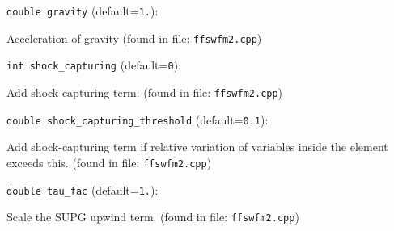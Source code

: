 \item\verb+double gravity+ {\rm(default=\verb|1.|)}:

Acceleration of gravity
 (found in file: \verb+ffswfm2.cpp+)
\item\verb+int shock_capturing+ {\rm(default=\verb|0|)}:

Add shock-capturing term.
 (found in file: \verb+ffswfm2.cpp+)
\item\verb+double shock_capturing_threshold+ {\rm(default=\verb|0.1|)}:

Add shock-capturing term if relative variation of variables
inside the element exceeds this.
 (found in file: \verb+ffswfm2.cpp+)
\item\verb+double tau_fac+ {\rm(default=\verb|1.|)}:

Scale the SUPG upwind term. 
 (found in file: \verb+ffswfm2.cpp+)
